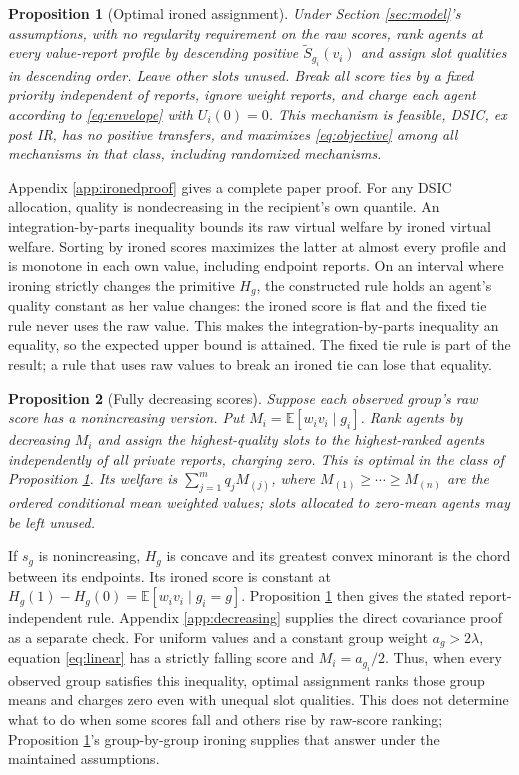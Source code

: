 \documentclass[11pt]{article}
\newtheorem{proposition}{Proposition}
\newcommand{\E}{\mathbb E}
\begin{document}
\begin{proposition}[Optimal ironed assignment]\label{prop:ironed}
Under Section \ref{sec:model}'s assumptions, with no regularity requirement on the raw scores, rank agents at every value-report profile by descending positive $\widetilde S_{g_i}(v_i)$ and assign slot qualities in descending order. Leave other slots unused. Break all score ties by a fixed priority independent of reports, ignore weight reports, and charge each agent according to \eqref{eq:envelope} with $U_i(0)=0$. This mechanism is feasible, DSIC, ex post IR, has no positive transfers, and maximizes \eqref{eq:objective} among all mechanisms in that class, including randomized mechanisms.
\end{proposition}

Appendix \ref{app:ironedproof} gives a complete paper proof. For any DSIC allocation, quality is nondecreasing in the recipient's own quantile. An integration-by-parts inequality bounds its raw virtual welfare by ironed virtual welfare. Sorting by ironed scores maximizes the latter at almost every profile and is monotone in each own value, including endpoint reports. On an interval where ironing strictly changes the primitive $H_g$, the constructed rule holds an agent's quality constant as her value changes: the ironed score is flat and the fixed tie rule never uses the raw value. This makes the integration-by-parts inequality an equality, so the expected upper bound is attained. The fixed tie rule is part of the result; a rule that uses raw values to break an ironed tie can lose that equality.

\begin{proposition}[Fully decreasing scores]\label{prop:decreasing}
Suppose each observed group's raw score has a nonincreasing version. Put $M_i=\E[w_i v_i\mid g_i]$. Rank agents by decreasing $M_i$ and assign the highest-quality slots to the highest-ranked agents independently of all private reports, charging zero. This is optimal in the class of Proposition \ref{prop:ironed}. Its welfare is $\sum_{j=1}^m q_j M_{(j)}$, where $M_{(1)}\ge\cdots\ge M_{(n)}$ are the ordered conditional mean weighted values; slots allocated to zero-mean agents may be left unused.
\end{proposition}

If $s_g$ is nonincreasing, $H_g$ is concave and its greatest convex minorant is the chord between its endpoints. Its ironed score is constant at $H_g(1)-H_g(0)=\E[w_i v_i\mid g_i=g]$. Proposition \ref{prop:ironed} then gives the stated report-independent rule. Appendix \ref{app:decreasing} supplies the direct covariance proof as a separate check. For uniform values and a constant group weight $a_g>2\lambda$, equation \eqref{eq:linear} has a strictly falling score and $M_i=a_{g_i}/2$. Thus, when every observed group satisfies this inequality, optimal assignment ranks those group means and charges zero even with unequal slot qualities. This does not determine what to do when some scores fall and others rise by raw-score ranking; Proposition \ref{prop:ironed}'s group-by-group ironing supplies that answer under the maintained assumptions.
\end{document}
